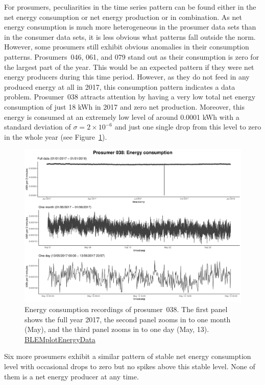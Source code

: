 For prosumers, peculiarities in the time series pattern can be found either in the net energy consumption or net energy production or in combination. As net energy consumption is much more heterogeneous in the prosumer data sets than in the consumer data sets, it is less obvious what patterns fall outside the norm. However, some prosumers still exhibit obvious anomalies in their consumption patterns. Prosumers~046, 061, and 079 stand out as their consumption is zero for the largest part of the year. This would be an expected pattern if they were net energy producers during this time period. However, as they do not feed in any produced energy at all in 2017, this consumption pattern indicates a data problem. Prosumer~038 attracts attention by having a very low total net energy consumption of just 18 kWh in 2017 and zero net production. Moreover, this energy is consumed at an extremely low level of around 0.0001 kWh with a standard deviation of $\sigma=2\times10^{-6}$ and just one single drop from this level to zero in the whole year (see Figure~\ref{Fig:energycons_p038}).
%
\begin{figure}[!htb]
 \centering
\includegraphics[width=\textwidth]{thesis/graphs/timeseries/p038_cons.pdf}
\caption[Energy consumption recordings of prosumer 038]{Energy consumption recordings of prosumer~038. The first panel shows the full year 2017, the second panel zooms in to one month (May), and the third panel zooms in to one day (May, 13). \quantnet\href{https://github.com/QuantLet/BLEM/tree/master/BLEMplotEnergyData}{BLEMplotEnergyData}}
\label{Fig:energycons_p038}
\end{figure}
%
Six more prosumers exhibit a similar pattern of stable net energy consumption level with occasional drops to zero but no spikes above this stable level. None of them is a net energy producer at any time.
  
